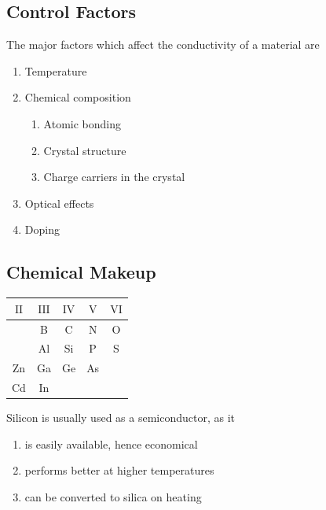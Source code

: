 \documentclass[titlepage, fleqn, a4paper, 12pt, twoside]{article}
\theoremstyle{definition}
\theoremstyle{theorem}
\let\Oldsubsection\subsection
\renewcommand{\subsection}{\FloatBarrier\Oldsubsection}
\begin{document}
\subsection{Control Factors}

The major factors which affect the conductivity of a material are

\begin{enumerate}
	\item Temperature
	\item Chemical composition
		\begin{enumerate}
			\item Atomic bonding
			\item Crystal structure
			\item Charge carriers in the crystal
		\end{enumerate}
	\item Optical effects
	\item Doping
\end{enumerate}

\subsection{Chemical Makeup}

\begin{table}[H]
	\begin{tabular}{c c c c c}
		\toprule
		$\mathrm{II}$ & $\mathrm{III}$ & $\mathrm{IV}$ & $\mathrm{V}$ & $\mathrm{VI}$ \\
		\midrule
                              & B              & C             & N            & O             \\
		\midrule
                              & Al             & Si            & P            & S             \\
		\midrule
		Zn            & Ga             & Ge            & As           &               \\
		\midrule
		Cd            & In             &               &              &               \\
		\bottomrule
	\end{tabular}
\end{table}

Silicon is usually used as a semiconductor, as it
\begin{enumerate}
	\item is easily available, hence economical
	\item performs better at higher temperatures
	\item can be converted to silica on heating
\end{enumerate}
\end{document}
